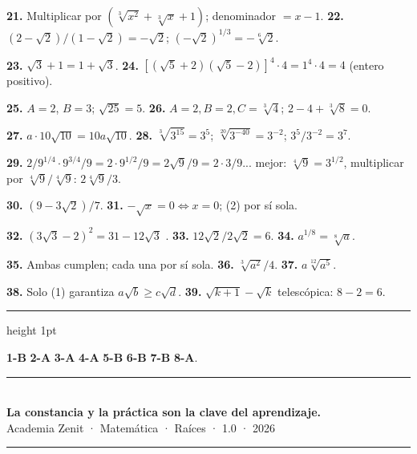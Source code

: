 \documentclass[11pt, letterpaper]{article}
\newcommand{\subbloque}[1]{%
  \vspace{14pt}
  \noindent{\large\bfseries\color{zenitnavy} #1}\par
  \vspace{4pt}\hrule height 1pt\vspace{8pt}}
\begin{document}
\textbf{21.} Multiplicar por $(\sqrt[3]{x^2}+\sqrt[3]{x}+1)$; denominador $=x-1$. \quad \textbf{22.} $(2-\sqrt{2})/(1-\sqrt{2})=-\sqrt{2}$; $(-\sqrt{2})^{1/3}=-\sqrt[6]{2}$.

\textbf{23.} $\sqrt{3}+1=1+\sqrt{3}$. \quad \textbf{24.} $[(\sqrt{5}+2)(\sqrt{5}-2)]^4\cdot4=1^4\cdot4=4$ (entero positivo).

\textbf{25.} $A=2$, $B=3$; $\sqrt{25}=5$. \quad \textbf{26.} $A=2,B=2,C=\sqrt[3]{4}$; $2-4+\sqrt[3]{8}=0$.

\textbf{27.} $a\cdot10\sqrt{10}=10a\sqrt{10}$. \quad \textbf{28.} $\sqrt[3]{3^{15}}=3^5$; $\sqrt[20]{3^{-40}}=3^{-2}$; $3^5/3^{-2}=3^7$.

\textbf{29.} $2/9^{1/4}\cdot9^{3/4}/9=2\cdot9^{1/2}/9=2\sqrt{9}/9=2\cdot3/9$... mejor: $\sqrt[4]{9}=3^{1/2}$, multiplicar por $\sqrt[4]{9}/\sqrt[4]{9}$: $2\sqrt[4]{9}/3$.

\textbf{30.} $(9-3\sqrt{2})/7$. \quad \textbf{31.} $-\sqrt{x}=0\Leftrightarrow x=0$; (2) por sí sola.

\textbf{32.} $(3\sqrt{3}-2)^2=31-12\sqrt{3}$ \checkmark{}. \quad \textbf{33.} $12\sqrt{2}/2\sqrt{2}=6$. \quad \textbf{34.} $a^{1/8}=\sqrt[8]{a}$.

\textbf{35.} Ambas cumplen; cada una por sí sola. \quad \textbf{36.} $\sqrt[3]{a^2}/4$. \quad \textbf{37.} $a\sqrt[12]{a^5}$.

\textbf{38.} Solo (1) garantiza $a\sqrt{b}\geq c\sqrt{d}$. \quad \textbf{39.} $\sqrt{k+1}-\sqrt{k}$ telescópica: $8-2=6$.

\subbloque{Alternativas}

\textbf{1-B} \quad \textbf{2-A} \quad \textbf{3-A} \quad \textbf{4-A} \quad \textbf{5-B} \quad \textbf{6-B} \quad \textbf{7-B} \quad \textbf{8-A}.

\vspace{8pt}
\begin{center}
  \rule{\linewidth}{1.5pt}\\[4pt]
  {\large\bfseries\color{zenitnavy} La constancia y la práctica son la clave del aprendizaje.}\\[2pt]
  {\color{zenitgold}\small Academia Zenit · Matemática · Raíces · 1.0 · 2026}
  \rule{\linewidth}{1.5pt}
\end{center}
\end{document}
